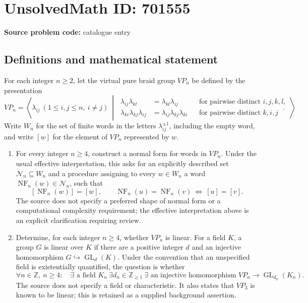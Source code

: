 \documentclass[11pt]{article}
\newcommand{\Z}{\mathbb{Z}}
\begin{document}
\section*{UnsolvedMath ID: 701555}
\textbf{Source problem code:} catalogue entry
\subsection{Definitions and mathematical statement}
For each integer \(n\geq 2\), let the virtual pure braid group \(VP_n\) be defined by the presentation
\[
VP_n=\left\langle \lambda_{ij}\ (1\leq i,j\leq n,\ i\neq j)\ \middle|\ 
\begin{aligned}
\lambda_{ij}\lambda_{kl}&=\lambda_{kl}\lambda_{ij}
&&\text{for pairwise distinct }i,j,k,l,\\
\lambda_{ki}\lambda_{kj}\lambda_{ij}&=\lambda_{ij}\lambda_{kj}\lambda_{ki}
&&\text{for pairwise distinct }k,i,j
\end{aligned}
\right\rangle.
\]
Write \(W_n\) for the set of finite words in the letters \(\lambda_{ij}^{\pm1}\), including the empty word, and write \([w]\) for the element of \(VP_n\) represented by \(w\).

\begin{enumerate}
\item[(a)] For every integer \(n\geq4\), construct a normal form for words in \(VP_n\). Under the usual effective interpretation, this asks for an explicitly described set \(\mathcal N_n\subseteq W_n\) and a procedure assigning to every \(w\in W_n\) a word \(\operatorname{NF}_n(w)\in\mathcal N_n\), such that
\[
[\operatorname{NF}_n(w)]=[w],\qquad
\operatorname{NF}_n(u)=\operatorname{NF}_n(v)
\ \Longleftrightarrow\ [u]=[v].
\]
The source does not specify a preferred shape of normal form or a computational complexity requirement; the effective interpretation above is an explicit clarification requiring review.

\item[(b)] Determine, for each integer \(n\geq4\), whether \(VP_n\) is linear. For a field \(K\), a group \(G\) is linear over \(K\) if there are a positive integer \(d\) and an injective homomorphism \(G\hookrightarrow\operatorname{GL}_d(K)\). Under the convention that an unspecified field is existentially quantified, the question is whether
\[
\forall n\in\Z,\ n\geq4:\quad
\exists\text{ a field }K_n\ \exists d_n\in\Z_{\geq1}\ 
\exists\text{ an injective homomorphism }
VP_n\longrightarrow\operatorname{GL}_{d_n}(K_n).
\]
The source does not specify a field or characteristic. It also states that \(VP_3\) is known to be linear; this is retained as a supplied background assertion.
\end{enumerate}
\end{document}

